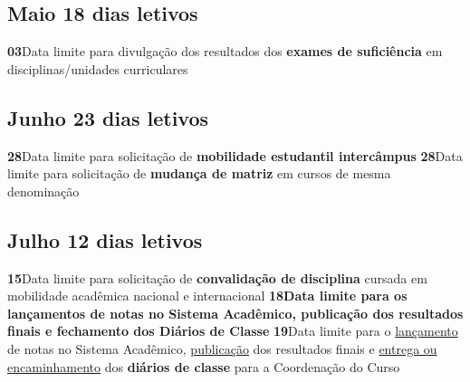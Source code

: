 \documentclass[thesis]{hmcposter}
\begin{document}
\begin{poster}
\subsection{Maio \hfill 18 dias letivos}\textbf{03}\qquad Data limite para divulgação dos resultados dos \textbf{exames de suficiência} em disciplinas/unidades curriculares \newline \null\subsection{Junho \hfill 23 dias letivos}\textbf{28}\qquad Data limite para solicitação de \textbf{mobilidade estudantil intercâmpus} \newline \null\textbf{28}\qquad Data limite para solicitação de \textbf{mudança de matriz} em cursos de mesma denominação \newline \null\subsection{Julho \hfill 12 dias letivos}\textbf{15}\qquad Data limite para solicitação de \textbf{convalidação de disciplina} cursada em mobilidade acadêmica nacional e internacional \newline \null\textbf{18}\qquad \textbf{Data limite para os lançamentos de notas no Sistema Acadêmico, publicação dos resultados finais e fechamento dos Diários de Classe} \newline \null\textbf{19}\qquad Data limite para o \underline{lançamento} de notas no Sistema Acadêmico, \underline{publicação} dos resultados finais e \underline{entrega ou encaminhamento} dos \textbf{diários de classe} para a Coordenação do Curso \newline \null\newpage

\end{poster}
\end{document}
